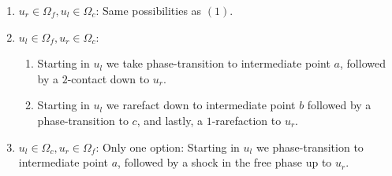 \documentclass[10pt]{article}
\numberwithin{equation}{section}
\begin{document}
\begin{enumerate}[label=\textsc{(\arabic*):}, wide]
    \item $u_r \in \Omega_f, u_l \in \Omega_c$: \newline
    Same possibilities as $(1)$.
    
    \item $u_l \in \Omega_f, u_r \in \Omega_c$:
    \begin{enumerate} [label=\textit{Possibility \roman*):}, wide]
    \item Starting in $u_l$ we take phase-transition to intermediate point $a$, followed by a $2$-contact down to $u_r$.
    \item Starting in $u_l$ we rarefact down to intermediate point $b$ followed by a phase-transition to $c$, and lastly, a $1$-rarefaction to $u_r$.
    \end{enumerate}
    
    \item $u_l \in \Omega_c, u_r \in \Omega_f$: \newline
    Only one option: Starting in $u_l$ we phase-transition to intermediate point $a$, followed by a shock in the free phase up to $u_r$.
\end{enumerate}
\end{document}
